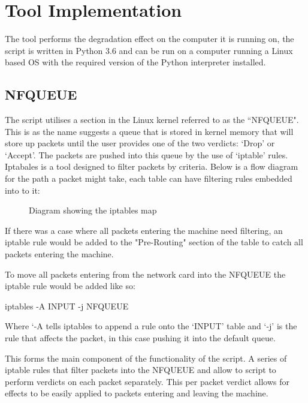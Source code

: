 %
\section{Tool Implementation}
The tool performs the degradation effect on the computer it is running on, the script is written in Python 3.6 \citep{pranskevichuspython} and can be run on a computer running a Linux based OS with the required version of the Python interpreter installed.


\subsection{NFQUEUE}
\label{ref:nfqueue}
The script utilises a section in the Linux kernel referred to as the ``NFQUEUE". This is as the name suggests a queue that is stored in kernel memory that will store up packets until the user provides one of the two verdicts: `Drop' or `Accept'. The packets are pushed into this queue by the use of `iptable' rules. Iptabales is a tool designed to filter packets by criteria. Below is a flow diagram for the path a packet might take, each table can have filtering rules embedded into to it:


\begin{figure}[h]
	\caption{Diagram showing the iptables map}
	\label{ref:iptables}
\end{figure}

If there was a case where all packets entering the machine need filtering, an iptable rule would be added to the "Pre-Routing" section of the table to catch all packets entering the machine. 

To move all packets entering from the network card into the NFQUEUE the iptable rule would be added like so:
\begin{center}
	\begin{console_font}
		\large{iptables -A INPUT -j NFQUEUE}
	\end{console_font} 
\end{center}
Where `-A tells iptables to append a rule onto the `INPUT' table and `-j' is the rule that affects the packet, in this case pushing it into the default queue.

This forms the main component of the functionality of the script. A series of iptable rules that filter packets into the NFQUEUE and allow to script to perform verdicts on each packet separately. This per packet verdict allows for effects to be easily applied to packets entering and leaving the machine.

